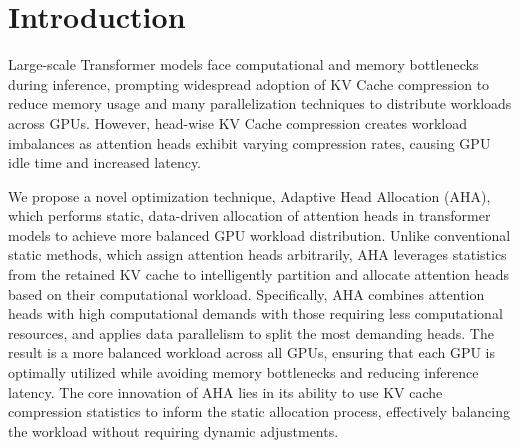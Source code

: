 \section{Introduction}

Large-scale Transformer models face computational and memory bottlenecks during inference, prompting widespread adoption of KV Cache compression to reduce memory usage and many parallelization techniques to distribute workloads across GPUs. However, head-wise KV Cache compression creates workload imbalances as attention heads exhibit varying compression rates, causing GPU idle time and increased latency.

We propose a novel optimization technique, Adaptive Head Allocation (AHA), which performs static, data-driven allocation of attention heads in transformer models to achieve more balanced GPU workload distribution. Unlike conventional static methods, which assign attention heads arbitrarily, AHA leverages statistics from the retained KV cache to intelligently partition and allocate attention heads based on their computational workload. Specifically, AHA combines attention heads with high computational demands with those requiring less computational resources, and applies data parallelism to split the most demanding heads. The result is a more balanced workload across all GPUs, ensuring that each GPU is optimally utilized while avoiding memory bottlenecks and reducing inference latency. The core innovation of AHA lies in its ability to use KV cache compression statistics to inform the static allocation process, effectively balancing the workload without requiring dynamic adjustments. 
